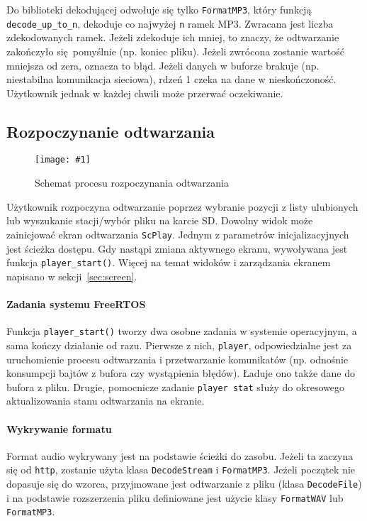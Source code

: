 \documentclass[12pt]{report}
\newcommand{\imgint}[4]{
	\begin{figure}[{#4}]
		\centering
		\texttt{[image: \#1]}
		\caption{#2}
		\label{#1}
	\end{figure}
}
\newcommand{\imgcs}[3]{\imgint{#1}{#2}{#3}{}}
\begin{document}
			Do biblioteki dekodującej odwołuje się tylko \lstinline|FormatMP3|, który funkcją \lstinline|decode_up_to_n|, dekoduje co najwyżej \lstinline|n| ramek MP3. Zwracana jest liczba zdekodowanych ramek. Jeżeli zdekoduje ich mniej, to znaczy, że odtwarzanie zakończyło się pomyślnie (np. koniec pliku). Jeżeli zwrócona zostanie wartość mniejsza od zera, oznacza to błąd. Jeżeli danych w buforze brakuje (np. niestabilna komunikacja sieciowa), rdzeń 1 czeka na dane w nieskończoność. Użytkownik jednak w każdej chwili może przerwać oczekiwanie.
		
		\subsection{Rozpoczynanie odtwarzania}
			\imgcs{3/PicoRadio-start}{Schemat procesu rozpoczynania odtwarzania}{0.7}
			Użytkownik rozpoczyna odtwarzanie poprzez wybranie pozycji z listy ulubionych lub wyszukanie stacji/wybór pliku na karcie SD. Dowolny widok może zainicjować ekran odtwarzania \lstinline|ScPlay|. Jednym z parametrów inicjalizacyjnych jest ścieżka dostępu. Gdy nastąpi zmiana aktywnego ekranu, wywoływana jest funkcja \lstinline|player_start()|. Więcej na temat widoków i zarządzania ekranem napisano w sekcji~\ref{sec:screen}.
			
			\paragraph{Zadania systemu FreeRTOS}
				Funkcja \lstinline|player_start()| tworzy dwa osobne zadania w systemie operacyjnym, a sama kończy działanie od razu. Pierwsze z nich, \lstinline|player|, odpowiedzialne jest za uruchomienie procesu odtwarzania i przetwarzanie komunikatów (np. odnośnie konsumpcji bajtów z bufora czy wystąpienia błędów). Ładuje ono także dane do bufora z pliku. Drugie, pomocnicze zadanie \lstinline|player stat| służy do okresowego aktualizowania stanu odtwarzania na ekranie.
			
			\paragraph{Wykrywanie formatu}
				Format audio wykrywany jest na podstawie ścieżki do zasobu. Jeżeli ta zaczyna się od \lstinline|http|, zostanie użyta klasa \lstinline|DecodeStream| i \lstinline|FormatMP3|. Jeżeli początek nie dopasuje się do wzorca, przyjmowane jest odtwarzanie z pliku (klasa \lstinline|DecodeFile|) i na podstawie rozszerzenia pliku definiowane jest użycie klasy \lstinline|FormatWAV| lub \lstinline|FormatMP3|.
				
\end{document}
